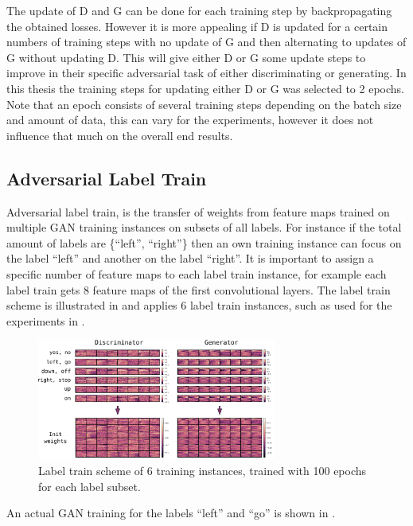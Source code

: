 The update of D and G can be done for each training step by backpropagating the obtained losses.
However it is more appealing if D is updated for a certain numbers of training steps with no update of G and then alternating to updates of G without updating D.
This will give either D or G some update steps to improve in their specific adversarial task of either discriminating or generating.
In this thesis the training steps for updating either D or G was selected to 2 epochs.
Note that an epoch consists of several training steps depending on the batch size and amount of data, this can vary for the experiments, however it does not influence that much on the overall end results.



\subsection{Adversarial Label Train}
Adversarial label train, is the transfer of weights from feature maps trained on multiple GAN training instances on subsets of all labels.
For instance if the total amount of labels are \{\enquote{left}, \enquote{right}\} then an own training instance can focus on the label \enquote{left} and another on the label \enquote{right}.
It is important to assign a specific number of feature maps to each label train instance, for example each label train gets 8 feature maps of the first convolutional layers.
The label train scheme is illustrated in  and applies 6 label train instances, such as used for the experiments in .
\begin{figure}[!ht]
  \centering
    \includegraphics[width=0.7\textwidth]{./4_nn/figs/nn_adv_label_scheme.pdf}
  \caption{Label train scheme of 6 training instances, trained with 100 epochs for each label subset.}
  \label{fig:nn_adv_label_scheme}
\end{figure}
\FloatBarrier
\noindent
An actual GAN training for the labels \enquote{left} and \enquote{go} is shown in .
